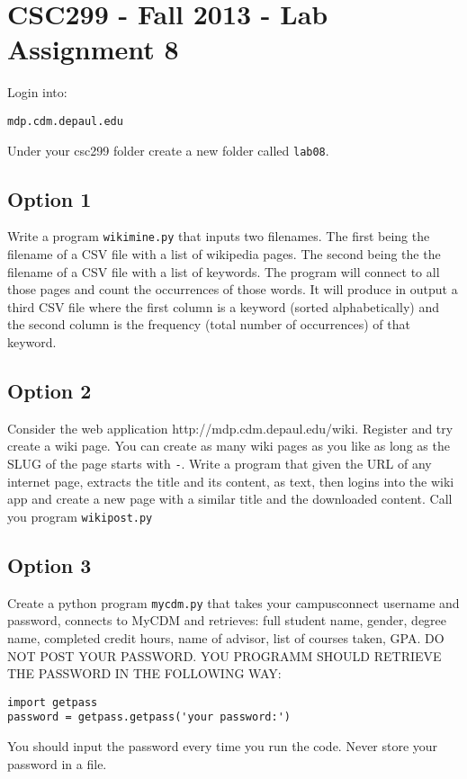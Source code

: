 \documentclass[12pt]{article}
\begin{document}
\section{CSC299 - Fall 2013 - Lab Assignment 8}

\noindent Login into:
\begin{verbatim}
mdp.cdm.depaul.edu
\end{verbatim}

\noindent Under your csc299 folder create a new folder called {\tt lab08}.

\subsection*{Option 1}

Write a program {\tt wikimine.py} that inputs two filenames. The first being the filename of a CSV file with a list of wikipedia pages. The second being the the filename of a CSV file with a list of keywords. The program will connect to all those pages and count the occurrences of those words. It will produce in output a third CSV file where the first column is a keyword (sorted alphabetically) and the second column is the frequency (total number of occurrences) of that keyword.

\subsection*{Option 2}

Consider the web application http://mdp.cdm.depaul.edu/wiki. Register and try create a wiki page. You can create as many wiki pages as you like as long as the SLUG of the page starts with {\tt <your username>-}. Write a program that given the URL of any internet page, extracts the title and its content, as text, then logins into the wiki app and create a new page with a similar title and the downloaded content. Call you program {\tt wikipost.py}

\subsection*{Option 3}

Create a python program {\tt mycdm.py} that takes your campusconnect username and password, connects to MyCDM and retrieves:
full student name, gender, degree name, completed credit hours, name of advisor, list of courses taken, GPA. DO NOT POST YOUR PASSWORD. YOU PROGRAMM SHOULD RETRIEVE THE PASSWORD IN THE FOLLOWING WAY:

\begin{verbatim}
import getpass
password = getpass.getpass('your password:')
\end{verbatim}

You should input the password every time you run the code. Never store your password in a file.
\end{document}
